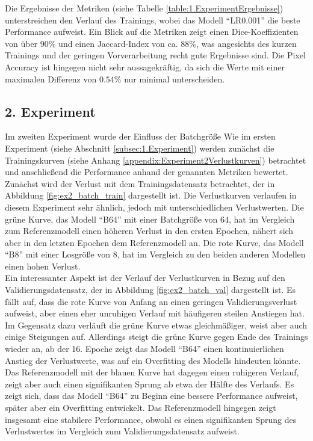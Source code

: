 Die Ergebnisse der Metriken (siehe Tabelle \ref{table:1.ExperimentErgebnisse}) unterstreichen den Verlauf des Trainings, wobei das Modell ``LR0.001'' die beste Performance aufweist. Ein Blick auf die Metriken zeigt einen Dice-Koeffizienten von über 90\% und einen Jaccard-Index von ca. 88\%, was angesichts des kurzen Trainings und der geringen Vorverarbeitung recht gute Ergebnisse sind. Die Pixel Accuracy ist hingegen nicht sehr aussagekräftig, da sich die Werte mit einer maximalen Differenz von $0.54\%$ nur minimal unterscheiden.

\subsection{2. Experiment}
Im zweiten Experiment wurde der Einfluss der Batchgröße Wie im ersten Experiment (siehe Abschnitt \ref{subsec:1.Experiment}) werden zunächst die Trainingskurven (siehe Anhang \ref{appendix:Experiment2Verlustkurven}) betrachtet und anschließend die Performance anhand der genannten Metriken bewertet.\\
Zunächst wird der Verlust mit dem Trainingsdatensatz betrachtet, der in Abbildung \ref{fig:ex2_batch_train} dargestellt ist. Die Verlustkurven verlaufen in diesem Experiment sehr ähnlich, jedoch mit unterschiedlichen Verlustwerten. Die grüne Kurve, das Modell ``B64'' mit einer Batchgröße von $64$, hat im Vergleich zum Referenzmodell einen höheren Verlust in den ersten Epochen, nähert sich aber in den letzten Epochen dem Referenzmodell an. Die rote Kurve, das Modell ``B8'' mit einer Losgröße von $8$, hat im Vergleich zu den beiden anderen Modellen einen hohen Verlust. \\
Ein interessanter Aspekt ist der Verlauf der Verlustkurven in Bezug auf den Validierungsdatensatz, der in Abbildung \ref{fig:ex2_batch_val} dargestellt ist. Es fällt auf, dass die rote Kurve von Anfang an einen geringen Validierungsverlust aufweist, aber einen eher unruhigen Verlauf mit häufigeren steilen Anstiegen hat. Im Gegensatz dazu verläuft die grüne Kurve etwas gleichmäßiger, weist aber auch einige Steigungen auf. Allerdings steigt die grüne Kurve gegen Ende des Trainings wieder an, ab der 16. Epoche zeigt das Modell ``B64'' einen kontinuierlichen Anstieg der Verlustwerte, was auf ein Overfitting des Modells hindeuten könnte. Das Referenzmodell mit der blauen Kurve hat dagegen einen ruhigeren Verlauf, zeigt aber auch einen signifikanten Sprung ab etwa der Hälfte des Verlaufs. Es zeigt sich, dass das Modell ``B64'' zu Beginn eine bessere Performance aufweist, später aber ein Overfitting entwickelt. Das Referenzmodell hingegen zeigt insgesamt eine stabilere Performance, obwohl es einen signifikanten Sprung des Verlustwertes im Vergleich zum Validierungsdatensatz aufweist. 

